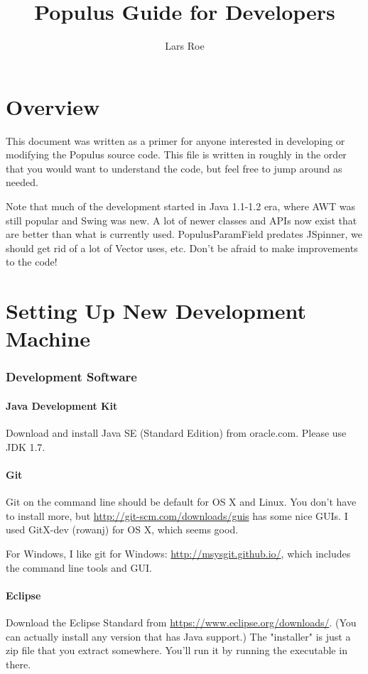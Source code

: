 \documentclass[12pt]{article}
\title{Populus Guide for Developers}
\author{Lars Roe}
\begin{document}
\maketitle
\newpage

\tableofcontents
\newpage

\part{Overview}
This document was written as a primer for anyone interested in developing or modifying the Populus source code.  This file is written in roughly in the order that you would want to understand the code, but feel free to jump around as needed.

Note that much of the development started in Java 1.1-1.2 era, where AWT was still popular and Swing was new.  A lot of newer classes and APIs now exist that are better than what is currently used.  PopulusParamField predates JSpinner, we should get rid of a lot of Vector uses, etc.  Don't be afraid to make improvements to the code!


\part{Setting Up New Development Machine}
\section{Development Software}
\subsection{Java Development Kit}
Download and install Java SE (Standard Edition) from oracle.com.  Please use JDK 1.7.

\subsection{Git}
Git on the command line should be default for OS X and Linux.  You don't have to install more, but \url{http://git-scm.com/downloads/guis} has some nice GUIs.  I used GitX-dev (rowanj) for OS X, which seems good.

For Windows, I like git for Windows:  \url{http://msysgit.github.io/}, which includes the command line tools and GUI.

\subsection{Eclipse}
Download the Eclipse Standard from \url{https://www.eclipse.org/downloads/}.  (You can actually install any version that has Java support.)  The "installer" is just a zip file that you extract somewhere.  You'll run it by running the executable in there.
\end{document}
